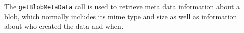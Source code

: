 The \verb+getBlobMetaData+ call is used to retrieve meta data information about a blob, which normally
includes its mime type and size as well as information about who created the data and when.
